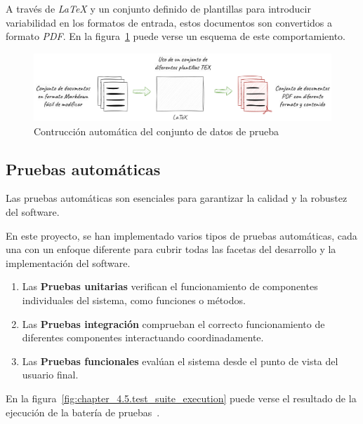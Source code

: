 A través de \textit{LaTeX} y un conjunto definido de plantillas para introducir variabilidad en los formatos de
entrada, estos documentos son convertidos a formato \textit{PDF}.
En la figura~\ref{fig:chapter_4.5.dataset_construction_overview} puede verse un esquema de este comportamiento.

\begin{figure}[ht]
    \begin{center}
        \includegraphics[width=\textwidth]{./chapter/4/images/chapter_4.5.dataset_construction_overview}
        \caption{Contrucción automática del conjunto de datos de prueba}
        \label{fig:chapter_4.5.dataset_construction_overview}
    \end{center}
\end{figure}

\subsection{Pruebas automáticas}

Las pruebas automáticas son esenciales para garantizar la calidad y la robustez del software.

En este proyecto, se han implementado varios tipos de pruebas automáticas, cada una con un enfoque diferente para cubrir
todas las facetas del desarrollo y la implementación del software.

\begin{enumerate}
    \item Las \textbf{Pruebas unitarias} verifican el funcionamiento de componentes individuales del sistema, como
    funciones o métodos.
    \item Las \textbf{Pruebas integración} comprueban el correcto funcionamiento de diferentes componentes
    interactuando coordinadamente.
    \item Las \textbf{Pruebas funcionales} evalúan el sistema desde el punto de vista del usuario final.
\end{enumerate}

En la figura~\ref{fig:chapter_4.5.test_suite_execution} puede verse el resultado de la ejecución de la batería de
pruebas~\cite{url_viu_84_proyecto_continous_integration}.

